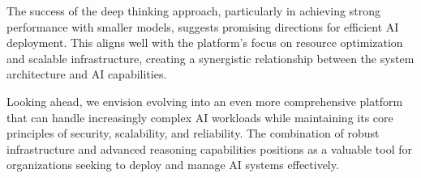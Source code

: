 The success of the deep thinking approach, particularly in achieving strong performance with smaller models, suggests promising directions for efficient AI deployment. This aligns well with the platform's focus on resource optimization and scalable infrastructure, creating a synergistic relationship between the system architecture and AI capabilities.

Looking ahead, we envision \sysname{} evolving into an even more comprehensive platform that can handle increasingly complex AI workloads while maintaining its core principles of security, scalability, and reliability. The combination of robust infrastructure and advanced reasoning capabilities positions \sysname{} as a valuable tool for organizations seeking to deploy and manage AI systems effectively.
